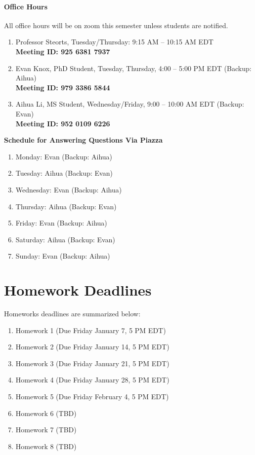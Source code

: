 \documentclass[11pt]{article}
\begin{document}
\paragraph{Office Hours}
All office hours will be on zoom this semester unless students are notified.
\begin{enumerate}
\item Professor Steorts, Tuesday/Thursday: 9:15 AM -- 10:15 AM EDT \\
\textbf{Meeting ID: 925 6381 7937}
\item Evan Knox, PhD Student, Tuesday, Thursday, 4:00 -- 5:00 PM EDT (Backup: Aihua)\\
\textbf{Meeting ID: 979 3386 5844} 
\item Aihua Li, MS Student, Wednesday/Friday, 9:00 -- 10:00 AM EDT  (Backup: Evan)\\
\textbf{Meeting ID: 952 0109 6226}
\end{enumerate}


\textbf{Schedule for Answering Questions Via Piazza}
\begin{enumerate}
\item Monday: Evan (Backup: Aihua)
\item Tuesday: Aihua (Backup: Evan)
\item Wednesday: Evan (Backup: Aihua)
\item Thursday: Aihua (Backup: Evan)
\item Friday: Evan (Backup: Aihua)
\item Saturday: Aihua (Backup: Evan)
\item Sunday: Evan (Backup: Aihua)
\end{enumerate}



\section{Homework Deadlines}
Homeworks deadlines are summarized below:

\begin{enumerate}
\item Homework 1 (Due Friday January 7, 5 PM EDT)
\item Homework 2 (Due Friday January 14, 5 PM EDT)
\item Homework 3 (Due Friday January 21, 5 PM EDT)
\item Homework 4 (Due Friday January 28, 5 PM EDT)
\item Homework 5 (Due Friday February 4, 5 PM EDT)
\item Homework 6 (TBD)
\item Homework 7 (TBD)
\item Homework 8 (TBD)
\end{enumerate} 
\end{document}
